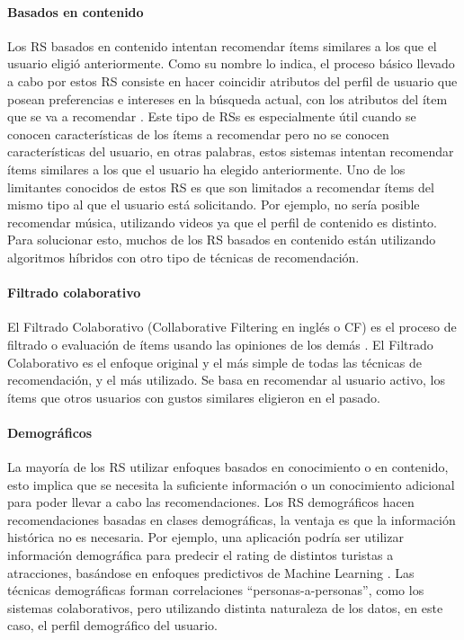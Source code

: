 \paragraph{Basados en contenido}
Los RS basados en contenido intentan recomendar ítems similares a los que el usuario eligió anteriormente. Como su nombre lo indica, el proceso básico llevado a cabo por estos RS consiste en hacer coincidir atributos del perfil de usuario que posean preferencias e intereses en la búsqueda actual, con los atributos del ítem que se va a recomendar \citep{lops2011content}. Este tipo de RSs es especialmente útil cuando se conocen características de los ítems a recomendar pero no se conocen características del usuario, en otras palabras, estos sistemas intentan recomendar ítems similares a los que el usuario ha elegido anteriormente. 
Uno de los limitantes conocidos de estos RS es que son limitados a recomendar ítems del mismo tipo al que el usuario está solicitando. Por ejemplo, no sería posible recomendar música, utilizando videos ya que el perfil de contenido es distinto. Para solucionar esto, muchos de los RS basados en contenido están utilizando algoritmos híbridos con otro tipo de técnicas de recomendación.

\paragraph{Filtrado colaborativo}
El Filtrado Colaborativo (Collaborative Filtering en inglés o CF) es el proceso de filtrado o evaluación de ítems usando las opiniones de los demás \citep{schafer2007collaborative}. El Filtrado Colaborativo es el enfoque original y el más simple de todas las técnicas de recomendación, y el más utilizado. Se basa en recomendar al usuario activo, los ítems que otros usuarios con gustos similares eligieron en el pasado.

\paragraph{Demográficos}
La mayoría de los RS 	utilizar enfoques basados en conocimiento o en contenido, esto implica que se necesita la suficiente información o un conocimiento adicional para poder llevar a cabo las recomendaciones. Los RS demográficos hacen recomendaciones basadas en clases demográficas, la ventaja es que la información histórica no es necesaria. Por ejemplo, una aplicación podría ser utilizar información demográfica para predecir el rating de distintos turistas a atracciones, basándose en enfoques predictivos de Machine Learning \citep{wang2012applicability}. Las técnicas demográficas forman correlaciones “personas-a-personas”, como los sistemas colaborativos, pero utilizando distinta naturaleza de los datos, en este caso, el perfil demográfico del usuario.

